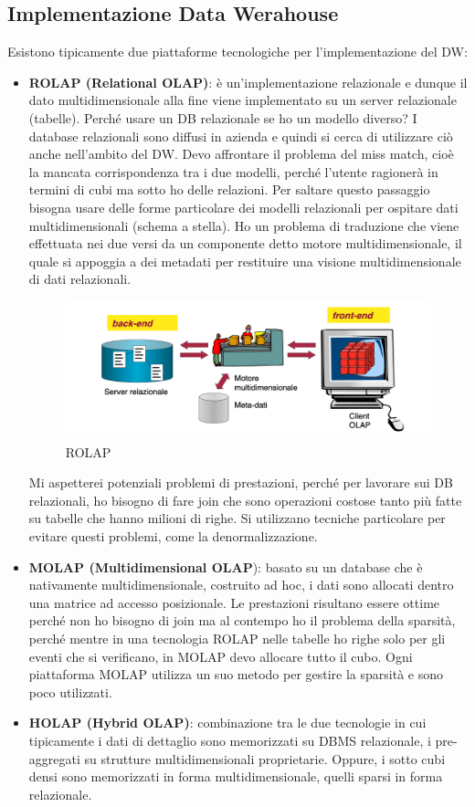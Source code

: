 \subsection{Implementazione Data Werahouse}
Esistono tipicamente due piattaforme tecnologiche per l’implementazione del DW:
\begin{itemize}
	\item 
	\textbf{ROLAP (Relational OLAP)}: è un’implementazione relazionale e dunque il dato multidimensionale alla fine viene implementato su un server relazionale (tabelle). Perché usare un DB relazionale se ho un modello diverso? I database relazionali sono diffusi in azienda e quindi si cerca di utilizzare ciò anche nell’ambito del DW. Devo affrontare il problema del miss match, cioè la mancata corrispondenza tra i due modelli, perché l’utente ragionerà in termini di cubi ma sotto ho delle relazioni. Per saltare questo passaggio bisogna usare delle forme particolare dei modelli relazionali per ospitare dati multidimensionali (schema a stella). Ho un problema di traduzione che viene effettuata nei due versi da un componente detto motore multidimensionale, il quale si appoggia a dei metadati per restituire una visione multidimensionale di dati relazionali. 
	\begin{figure}[H]
		\centering
		\includegraphics[width=0.7\linewidth]{img/rolap}
		\caption{ROLAP}
		\label{fig:rolap}
	\end{figure}
	Mi aspetterei potenziali problemi di prestazioni, perché per lavorare sui DB relazionali, ho bisogno di fare join che sono operazioni costose tanto più fatte su tabelle che hanno milioni di righe. Si utilizzano tecniche particolare per evitare questi problemi, come la denormalizzazione.
	\item 
	\textbf{MOLAP (Multidimensional OLAP}): basato su un database che è nativamente multidimensionale, costruito ad hoc, i dati sono allocati dentro una matrice ad accesso posizionale. Le prestazioni risultano essere ottime perché non ho bisogno di join ma al contempo ho il problema della sparsità, perché mentre in una tecnologia ROLAP nelle tabelle ho righe solo per gli eventi che si verificano, in MOLAP devo allocare tutto il cubo. Ogni piattaforma MOLAP utilizza un suo metodo per gestire la sparsità e sono poco utilizzati. 
	\item 
	\textbf{HOLAP (Hybrid OLAP)}: combinazione tra le due tecnologie in cui tipicamente i dati di dettaglio sono memorizzati su DBMS relazionale, i pre-aggregati su strutture multidimensionali proprietarie. Oppure, i sotto cubi densi sono memorizzati in forma multidimensionale, quelli sparsi in forma relazionale. 
\end{itemize}

